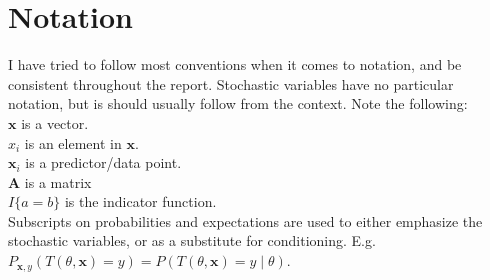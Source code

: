 \section{Notation}
\label{sec:Notation}
I have tried to follow most conventions when it comes to notation, and be consistent throughout the report. Stochastic variables have no particular notation, but is should usually follow from the context. Note the following:\\
$\mathbf{x}$ is a vector. \\
$x_i$ is an element in $\mathbf{x}$. \\
$\mathbf{x}_i$ is a predictor/data point.  \\
$\mathbf{A}$ is a matrix \\
$I\{a = b\}$ is the indicator function.\\
Subscripts on probabilities and expectations are used to either emphasize the stochastic variables, or as a substitute for conditioning. 
E.g. $P_{\mathbf{x}, y}(T(\theta, \mathbf{x}) = y) = P(T(\theta, \mathbf{x}) = y \mid \theta)$.

